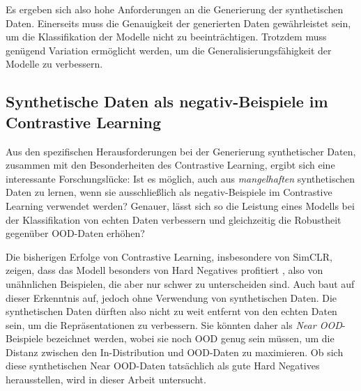 Es ergeben sich also hohe Anforderungen an die Generierung der synthetischen Daten. Einerseits muss die Genauigkeit der generierten Daten gewährleistet sein, um die Klassifikation der Modelle nicht zu beeinträchtigen. Trotzdem muss genügend Variation ermöglicht werden, um die Generalisierungsfähigkeit der Modelle zu verbessern.

\subsection{Synthetische Daten als negativ-Beispiele im Contrastive Learning} \label{sec:synt-ood-contrastive}

Aus den spezifischen Herausforderungen bei der Generierung synthetischer Daten, zusammen mit den Besonderheiten des Contrastive Learning, ergibt sich eine interessante Forschungslücke: Ist es möglich, auch aus \textit{mangelhaften} synthetischen Daten zu lernen, wenn sie ausschließlich als negativ-Beispiele im Contrastive Learning verwendet werden? Genauer, lässt sich so die Leistung eines Modells bei der Klassifikation von echten Daten verbessern und gleichzeitig die Robustheit gegenüber OOD-Daten erhöhen?

Die bisherigen Erfolge von Contrastive Learning, insbesondere von SimCLR, zeigen, dass das Modell besonders von Hard Negatives profitiert \parencite{Chen2020simclr}, also von unähnlichen Beispielen, die aber nur schwer zu unterscheiden sind. Auch \parencite{Jiang2024supconhardnegatives} baut auf dieser Erkenntnis auf, jedoch ohne Verwendung von synthetischen Daten. Die synthetischen Daten dürften also nicht zu weit entfernt von den echten Daten sein, um die Repräsentationen zu verbessern. Sie könnten daher als \textit{Near OOD}-Beispiele bezeichnet werden, wobei sie noch OOD genug sein müssen, um die Distanz zwischen den In-Distribution und OOD-Daten zu maximieren. Ob sich diese synthetischen Near OOD-Daten tatsächlich als gute Hard Negatives herausstellen, wird in dieser Arbeit untersucht.


